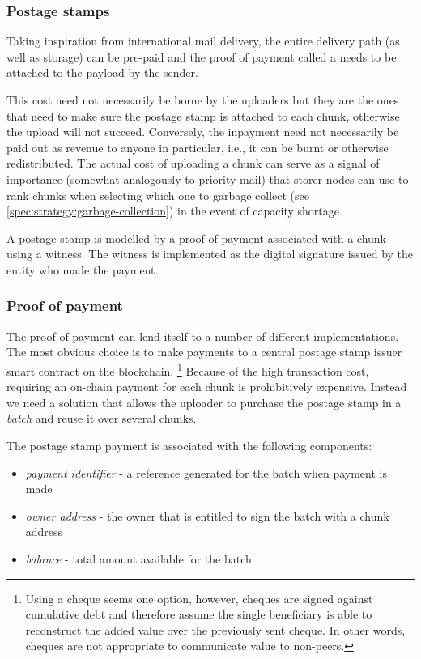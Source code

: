 \subsubsection{Postage stamps}

Taking inspiration from international mail delivery, the entire delivery path (as well as storage) can be pre-paid and the proof of payment called a  needs to be attached to the payload by the sender.

This cost need not necessarily be borne by the uploaders but they are the ones that need to make sure the postage stamp is attached to each chunk,  otherwise the upload will not succeed. Conversely, the inpayment need not necessarily be paid out as revenue to anyone in particular, i.e., it can be burnt or otherwise redistributed. The actual cost of uploading a chunk can serve as a signal of importance (somewhat analogously to priority mail) that storer nodes can use to rank chunks when selecting which one to garbage collect (see \ref{spec:strategy:garbage-collection}) in the event of capacity shortage.

A postage stamp is modelled by a proof of payment associated with a chunk using a witness. The witness is implemented as the digital signature issued by the entity who made the payment.


\subsubsection{Proof of payment}

The proof of payment can lend itself to a number of different implementations. The most obvious choice is to make payments to a central postage stamp issuer smart contract on the blockchain.%
%
\footnote{Using a cheque seems one option, however, cheques are  signed against cumulative debt and therefore assume the single beneficiary is able to reconstruct the added value over the previously sent cheque. In other words, cheques are not appropriate to communicate value to non-peers.}
%
Because of the high transaction cost, requiring an on-chain payment for each chunk is prohibitively expensive. Instead we need a solution that allows the uploader to purchase the postage stamp in a \emph{batch} and reuse it over several chunks. 

The postage stamp payment is associated with the following components:

\begin{itemize}
\item \emph{payment identifier} - a reference generated for  the batch when payment is made
\item \emph{owner address} - the owner that is entitled to sign the batch with a chunk address
\item \emph{balance} - total amount available for the batch
\end{itemize}

